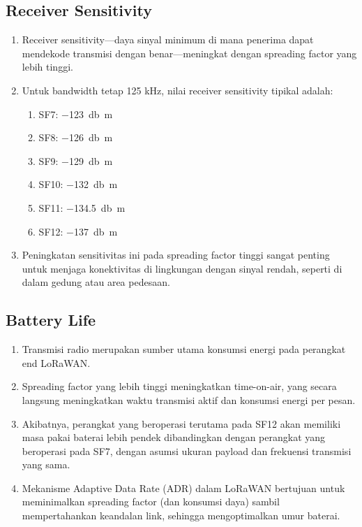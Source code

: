 \subsection{Receiver Sensitivity}
\begin{enumerate}
    \item Receiver sensitivity—daya sinyal minimum di mana penerima dapat mendekode transmisi dengan benar—meningkat dengan spreading factor yang lebih tinggi.
    \item Untuk bandwidth tetap 125 kHz, nilai receiver sensitivity tipikal adalah:
          \begin{enumerate}
              \item SF7: \SI{-123}{\decibel m}
              \item SF8: \SI{-126}{\decibel m}
              \item SF9: \SI{-129}{\decibel m}
              \item SF10: \SI{-132}{\decibel m}
              \item SF11: \SI{-134.5}{\decibel m}
              \item SF12: \SI{-137}{\decibel m}
          \end{enumerate}
    \item Peningkatan sensitivitas ini pada spreading factor tinggi sangat penting untuk menjaga konektivitas di lingkungan dengan sinyal rendah, seperti di dalam gedung atau area pedesaan.
\end{enumerate}
\subsection{Battery Life}
\begin{enumerate}
    \item Transmisi radio merupakan sumber utama konsumsi energi pada perangkat end LoRaWAN.
    \item Spreading factor yang lebih tinggi meningkatkan time-on-air, yang secara langsung meningkatkan waktu transmisi aktif dan konsumsi energi per pesan.
    \item Akibatnya, perangkat yang beroperasi terutama pada SF12 akan memiliki masa pakai baterai lebih pendek dibandingkan dengan perangkat yang beroperasi pada SF7, dengan asumsi ukuran payload dan frekuensi transmisi yang sama.
    \item Mekanisme Adaptive Data Rate (ADR) dalam LoRaWAN bertujuan untuk meminimalkan spreading factor (dan konsumsi daya) sambil mempertahankan keandalan link, sehingga mengoptimalkan umur baterai.
\end{enumerate}

